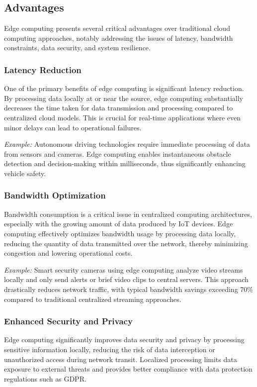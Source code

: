 \documentclass[runningheads]{llncs}
\begin{document}
\subsection{Advantages}

Edge computing presents several critical advantages over traditional cloud computing approaches, notably addressing the issues of latency, bandwidth constraints, data security, and system resilience.

\subsubsection{Latency Reduction}
One of the primary benefits of edge computing is significant latency reduction. By processing data locally at or near the source, edge computing substantially decreases the time taken for data transmission and processing compared to centralized cloud models. This is crucial for real-time applications where even minor delays can lead to operational failures.

\textit{Example:} Autonomous driving technologies require immediate processing of data from sensors and cameras. Edge computing enables instantaneous obstacle detection and decision-making within milliseconds, thus significantly enhancing vehicle safety.

\subsubsection{Bandwidth Optimization}
Bandwidth consumption is a critical issue in centralized computing architectures, especially with the growing amount of data produced by IoT devices. Edge computing effectively optimizes bandwidth usage by processing data locally, reducing the quantity of data transmitted over the network, thereby minimizing congestion and lowering operational costs.

\textit{Example:} Smart security cameras using edge computing analyze video streams locally and only send alerts or brief video clips to central servers. This approach drastically reduces network traffic, with typical bandwidth savings exceeding 70\% compared to traditional centralized streaming approaches.

\subsubsection{Enhanced Security and Privacy}
Edge computing significantly improves data security and privacy by processing sensitive information locally, reducing the risk of data interception or unauthorized access during network transit. Localized processing limits data exposure to external threats and provides better compliance with data protection regulations such as GDPR.
\end{document}
